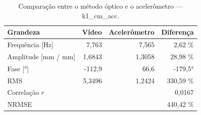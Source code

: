 \begin{table}[htbp]
  \centering
  \caption{Comparação entre o método óptico e o acelerômetro — k1\_cm\_acc.}
  \label{tab:comp_k1_cm_acc}
  \begin{tabular}{lrrr}
    \toprule
    Grandeza & Vídeo & Acelerômetro & Diferença \\
    \midrule
    Frequência [Hz] & 7{,}763 & 7{,}565 & 2{,}62 \% \\
    Amplitude [mm / mm] & 1{,}6843 & 1{,}3058 & 28{,}98 \% \\
    Fase [°] & -112{,}9 & 66{,}6 & -179{,}5° \\
    RMS & 5{,}3496 & 1{,}2424 & 330{,}59 \% \\
    Correlação $r$ &  &  & 0{,}0167 \\
    NRMSE &  &  & 440{,}42 \% \\
    \bottomrule
  \end{tabular}
\end{table}
